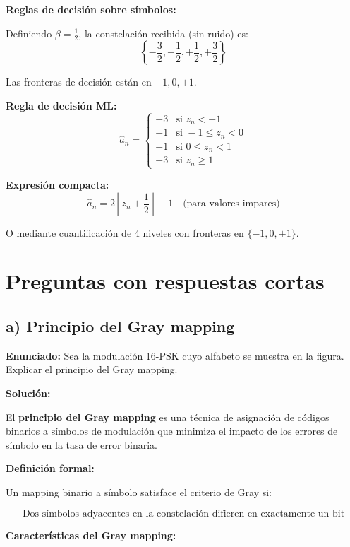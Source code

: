 \documentclass[11pt,a4paper]{article}
\begin{document}
\textbf{Reglas de decisi\'on sobre s\'imbolos:}

Definiendo $\beta = \frac{1}{2}$, la constelaci\'on recibida (sin ruido) es:
\[
\left\{-\frac{3}{2}, -\frac{1}{2}, +\frac{1}{2}, +\frac{3}{2}\right\}
\]

Las fronteras de decisi\'on est\'an en $-1, 0, +1$.

\textbf{Regla de decisi\'on ML:}
\[
\boxed{
\hat{a}_n = \begin{cases}
-3 & \text{si } z_n < -1 \\
-1 & \text{si } -1 \leq z_n < 0 \\
+1 & \text{si } 0 \leq z_n < 1 \\
+3 & \text{si } z_n \geq 1
\end{cases}
}
\]

\textbf{Expresi\'on compacta:}
\[
\hat{a}_n = 2 \left\lfloor z_n + \frac{1}{2} \right\rfloor + 1 \quad \text{(para valores impares)}
\]

O mediante cuantificaci\'on de 4 niveles con fronteras en $\{-1, 0, +1\}$.



\newpage
\section*{Preguntas con respuestas cortas}

\subsection*{a) Principio del Gray mapping}

\textbf{Enunciado:} Sea la modulaci\'on 16-PSK cuyo alfabeto se muestra en la figura. Explicar el principio del Gray mapping.

\vspace{0.3cm}
\textbf{Soluci\'on:}

El \textbf{principio del Gray mapping} es una t\'ecnica de asignaci\'on de c\'odigos binarios a s\'imbolos de modulaci\'on que minimiza el impacto de los errores de s\'imbolo en la tasa de error binaria.

\textbf{Definici\'on formal:}

Un mapping binario a s\'imbolo satisface el criterio de Gray si:

\[
\boxed{\text{Dos s\'imbolos adyacentes en la constelaci\'on difieren en exactamente un bit}}
\]

\textbf{Caracter\'isticas del Gray mapping:}
\end{document}

